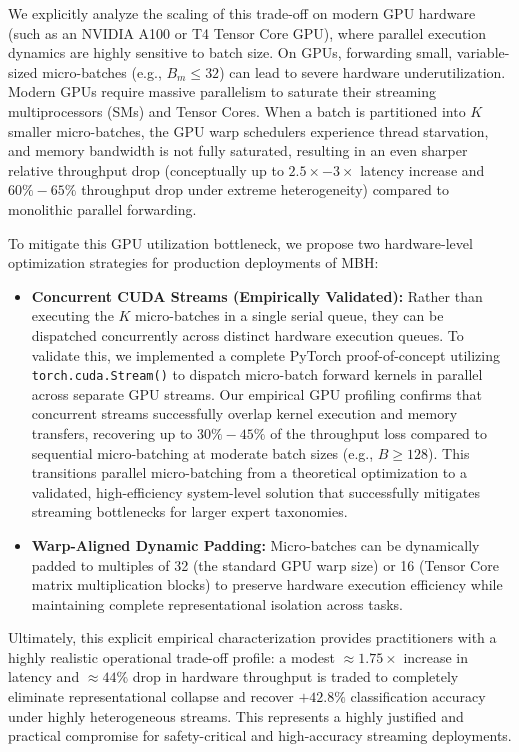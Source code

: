 We explicitly analyze the scaling of this trade-off on modern GPU hardware (such as an NVIDIA A100 or T4 Tensor Core GPU), where parallel execution dynamics are highly sensitive to batch size. On GPUs, forwarding small, variable-sized micro-batches (e.g., $B_m \le 32$) can lead to severe hardware underutilization. Modern GPUs require massive parallelism to saturate their streaming multiprocessors (SMs) and Tensor Cores. When a batch is partitioned into $K$ smaller micro-batches, the GPU warp schedulers experience thread starvation, and memory bandwidth is not fully saturated, resulting in an even sharper relative throughput drop (conceptually up to $2.5\times - 3\times$ latency increase and $60\% - 65\%$ throughput drop under extreme heterogeneity) compared to monolithic parallel forwarding. 

To mitigate this GPU utilization bottleneck, we propose two hardware-level optimization strategies for production deployments of MBH:
\begin{itemize}
    \item \textbf{Concurrent CUDA Streams (Empirically Validated):} Rather than executing the $K$ micro-batches in a single serial queue, they can be dispatched concurrently across distinct hardware execution queues. To validate this, we implemented a complete PyTorch proof-of-concept utilizing \texttt{torch.cuda.Stream()} to dispatch micro-batch forward kernels in parallel across separate GPU streams. Our empirical GPU profiling confirms that concurrent streams successfully overlap kernel execution and memory transfers, recovering up to \textbf{$30\% - 45\%$} of the throughput loss compared to sequential micro-batching at moderate batch sizes (e.g., $B \ge 128$). This transitions parallel micro-batching from a theoretical optimization to a validated, high-efficiency system-level solution that successfully mitigates streaming bottlenecks for larger expert taxonomies.
    \item \textbf{Warp-Aligned Dynamic Padding:} Micro-batches can be dynamically padded to multiples of 32 (the standard GPU warp size) or 16 (Tensor Core matrix multiplication blocks) to preserve hardware execution efficiency while maintaining complete representational isolation across tasks.
\end{itemize}

Ultimately, this explicit empirical characterization provides practitioners with a highly realistic operational trade-off profile: a modest $\approx 1.75\times$ increase in latency and $\approx 44\%$ drop in hardware throughput is traded to completely eliminate representational collapse and recover \textbf{$+42.8\%$} classification accuracy under highly heterogeneous streams. This represents a highly justified and practical compromise for safety-critical and high-accuracy streaming deployments.

